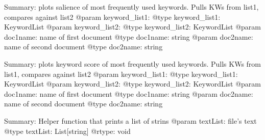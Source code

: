 \documentclass[letterpaper,10pt,english]{sphinxmanual}
\begin{document}

\begin{fulllineitems}
\label{\detokenize{functionsv1:common_functions.plotkeywordsalience}}
Summary: plots salience of most frequently used keywords. Pulls KWs from list1, compares against list2
@param keyword\_list1:
@type keyword\_list1: KeywordList
@param keyword\_list2:
@type keyword\_list2: KeywordList
@param doc1name: name of first document
@type doc1name: string
@param doc2name: name of second document
@type doc2name: string

\end{fulllineitems}


\begin{fulllineitems}
\label{\detokenize{functionsv1:common_functions.plotkeywordscores}}
Summary: plots keyword score of most frequently used keywords. Pulls KWs from list1, compares against list2
@param keyword\_list1:
@type keyword\_list1: KeywordList
@param keyword\_list2:
@type keyword\_list2: KeywordList
@param doc1name: name of first document
@type doc1name: string
@param doc2name: name of second document
@type doc2name: string

\end{fulllineitems}


\begin{fulllineitems}
\label{\detokenize{functionsv1:common_functions.printStringList}}
Summary: Helper function that prints a list of strins
@param textList: file’s text
@type textList: List{[}string{]}
@rtype: void

\end{fulllineitems}


\begin{fulllineitems}
\label{\detokenize{functionsv1:common_functions.savefile}}
\end{fulllineitems}
\end{document}
